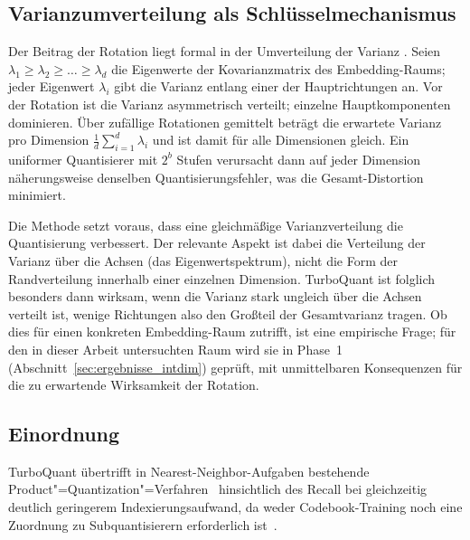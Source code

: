 \subsection{Varianzumverteilung als Schlüsselmechanismus}
%
Der Beitrag der Rotation liegt formal in der Umverteilung der Varianz \cite{zandieh_2025_turboquant}.
Seien $\lambda_1 \geq \lambda_2 \geq \ldots \geq \lambda_d$ die Eigenwerte der Kovarianzmatrix des Embedding-Raums; jeder Eigenwert $\lambda_i$ gibt die Varianz entlang einer der Hauptrichtungen an.
Vor der Rotation ist die Varianz asymmetrisch verteilt; einzelne Hauptkomponenten dominieren.
Über zufällige Rotationen gemittelt beträgt die erwartete Varianz pro Dimension $\frac{1}{d}\sum_{i=1}^d \lambda_i$ und ist damit für alle Dimensionen gleich.
Ein uniformer Quantisierer mit $2^b$ Stufen verursacht dann auf jeder Dimension näherungsweise denselben Quantisierungsfehler, was die Gesamt-Distortion minimiert.
\par
Die Methode setzt voraus, dass eine gleichmäßige Varianzverteilung die Quantisierung verbessert.
Der relevante Aspekt ist dabei die Verteilung der Varianz über die Achsen (das Eigenwertspektrum), nicht die Form der Randverteilung innerhalb einer einzelnen Dimension.
TurboQuant ist folglich besonders dann wirksam, wenn die Varianz stark ungleich über die Achsen verteilt ist, wenige Richtungen also den Großteil der Gesamtvarianz tragen.
Ob dies für einen konkreten Embedding-Raum zutrifft, ist eine empirische Frage; für den in dieser Arbeit untersuchten Raum wird sie in Phase~1 (Abschnitt~\ref{sec:ergebnisse_intdim}) geprüft, mit unmittelbaren Konsequenzen für die zu erwartende Wirksamkeit der Rotation.
%
\subsection{Einordnung}
%
TurboQuant übertrifft in Nearest-Neighbor-Aufgaben bestehende Product"=Quantization"=Verfahren~\cite{jegou_2011_pq} hinsichtlich des Recall bei gleichzeitig deutlich geringerem Indexierungsaufwand, da weder Codebook-Training noch eine Zuordnung zu Subquantisierern erforderlich ist~\cite{zandieh_2025_turboquant}.
%
%
